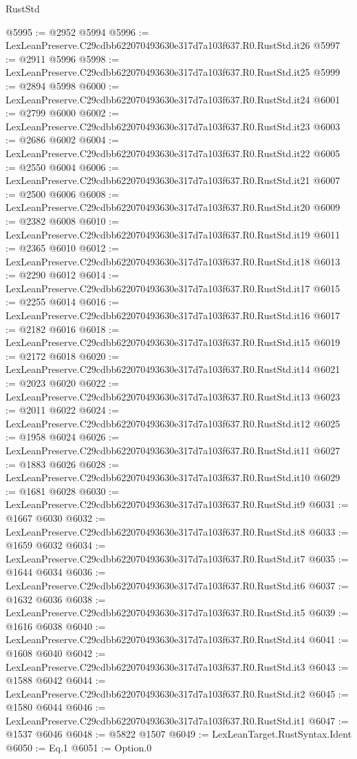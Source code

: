 \begin{lexlean}{RustStd}
\begin{coremodule}
@5995 := @2952 @5994
@5996 := LexLeanPreserve.C29cdbb622070493630e317d7a103f637.R0.RustStd.it26
@5997 := @2911 @5996
@5998 := LexLeanPreserve.C29cdbb622070493630e317d7a103f637.R0.RustStd.it25
@5999 := @2894 @5998
@6000 := LexLeanPreserve.C29cdbb622070493630e317d7a103f637.R0.RustStd.it24
@6001 := @2799 @6000
@6002 := LexLeanPreserve.C29cdbb622070493630e317d7a103f637.R0.RustStd.it23
@6003 := @2686 @6002
@6004 := LexLeanPreserve.C29cdbb622070493630e317d7a103f637.R0.RustStd.it22
@6005 := @2550 @6004
@6006 := LexLeanPreserve.C29cdbb622070493630e317d7a103f637.R0.RustStd.it21
@6007 := @2500 @6006
@6008 := LexLeanPreserve.C29cdbb622070493630e317d7a103f637.R0.RustStd.it20
@6009 := @2382 @6008
@6010 := LexLeanPreserve.C29cdbb622070493630e317d7a103f637.R0.RustStd.it19
@6011 := @2365 @6010
@6012 := LexLeanPreserve.C29cdbb622070493630e317d7a103f637.R0.RustStd.it18
@6013 := @2290 @6012
@6014 := LexLeanPreserve.C29cdbb622070493630e317d7a103f637.R0.RustStd.it17
@6015 := @2255 @6014
@6016 := LexLeanPreserve.C29cdbb622070493630e317d7a103f637.R0.RustStd.it16
@6017 := @2182 @6016
@6018 := LexLeanPreserve.C29cdbb622070493630e317d7a103f637.R0.RustStd.it15
@6019 := @2172 @6018
@6020 := LexLeanPreserve.C29cdbb622070493630e317d7a103f637.R0.RustStd.it14
@6021 := @2023 @6020
@6022 := LexLeanPreserve.C29cdbb622070493630e317d7a103f637.R0.RustStd.it13
@6023 := @2011 @6022
@6024 := LexLeanPreserve.C29cdbb622070493630e317d7a103f637.R0.RustStd.it12
@6025 := @1958 @6024
@6026 := LexLeanPreserve.C29cdbb622070493630e317d7a103f637.R0.RustStd.it11
@6027 := @1883 @6026
@6028 := LexLeanPreserve.C29cdbb622070493630e317d7a103f637.R0.RustStd.it10
@6029 := @1681 @6028
@6030 := LexLeanPreserve.C29cdbb622070493630e317d7a103f637.R0.RustStd.it9
@6031 := @1667 @6030
@6032 := LexLeanPreserve.C29cdbb622070493630e317d7a103f637.R0.RustStd.it8
@6033 := @1659 @6032
@6034 := LexLeanPreserve.C29cdbb622070493630e317d7a103f637.R0.RustStd.it7
@6035 := @1644 @6034
@6036 := LexLeanPreserve.C29cdbb622070493630e317d7a103f637.R0.RustStd.it6
@6037 := @1632 @6036
@6038 := LexLeanPreserve.C29cdbb622070493630e317d7a103f637.R0.RustStd.it5
@6039 := @1616 @6038
@6040 := LexLeanPreserve.C29cdbb622070493630e317d7a103f637.R0.RustStd.it4
@6041 := @1608 @6040
@6042 := LexLeanPreserve.C29cdbb622070493630e317d7a103f637.R0.RustStd.it3
@6043 := @1588 @6042
@6044 := LexLeanPreserve.C29cdbb622070493630e317d7a103f637.R0.RustStd.it2
@6045 := @1580 @6044
@6046 := LexLeanPreserve.C29cdbb622070493630e317d7a103f637.R0.RustStd.it1
@6047 := @1537 @6046
@6048 := @5822 @1507
@6049 := LexLeanTarget.RustSyntax.Ident
@6050 := Eq.{1}
@6051 := Option.{0}

\end{coremodule}
\end{lexlean}
